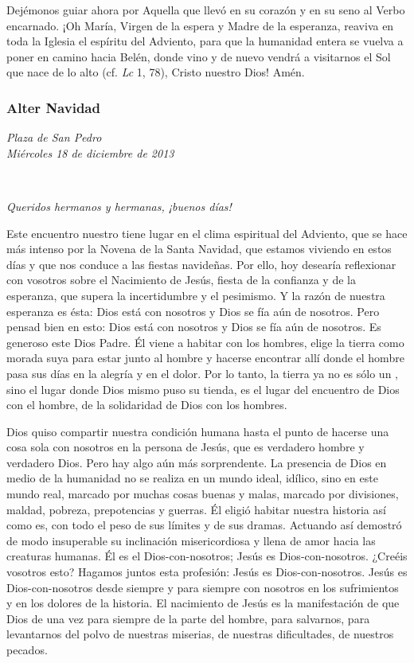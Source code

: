 Dejémonos guiar ahora por Aquella que llevó en su corazón y en su seno al Verbo encarnado. ¡Oh María, Virgen de la espera y Madre de la esperanza, reaviva en toda la Iglesia el espíritu del Adviento, para que la humanidad entera se vuelva a poner en camino hacia Belén, donde vino y de nuevo vendrá a visitarnos el Sol que nace de lo alto (cf. \emph{Lc} 1, 78), Cristo nuestro Dios! Amén.

\subsubsection{Alter Navidad} \emph{Plaza de San Pedro}\\ \emph{Miércoles 18 de diciembre de 2013}


~

\emph{Queridos hermanos y hermanas, ¡buenos días!}

Este encuentro nuestro tiene lugar en el clima espiritual del Adviento, que se hace más intenso por la Novena de la Santa Navidad, que estamos viviendo en estos días y que nos conduce a las fiestas navideñas. Por ello, hoy desearía reflexionar con vosotros sobre el Nacimiento de Jesús, fiesta de la confianza y de la esperanza, que supera la incertidumbre y el pesimismo. Y la razón de nuestra esperanza es ésta: Dios está con nosotros y Dios se fía aún de nosotros. Pero pensad bien en esto: Dios está con nosotros y Dios se fía aún de nosotros. Es generoso este Dios Padre. Él viene a habitar con los hombres, elige la tierra como morada suya para estar junto al hombre y hacerse encontrar allí donde el hombre pasa sus días en la alegría y en el dolor. Por lo tanto, la tierra ya no es sólo un , sino el lugar donde Dios mismo puso su tienda, es el lugar del encuentro de Dios con el hombre, de la solidaridad de Dios con los hombres.

Dios quiso compartir nuestra condición humana hasta el punto de hacerse una cosa sola con nosotros en la persona de Jesús, que es verdadero hombre y verdadero Dios. Pero hay algo aún más sorprendente. La presencia de Dios en medio de la humanidad no se realiza en un mundo ideal, idílico, sino en este mundo real, marcado por muchas cosas buenas y malas, marcado por divisiones, maldad, pobreza, prepotencias y guerras. Él eligió habitar nuestra historia así como es, con todo el peso de sus límites y de sus dramas. Actuando así demostró de modo insuperable su inclinación misericordiosa y llena de amor hacia las creaturas humanas. Él es el Dios-con-nosotros; Jesús es Dios-con-nosotros. ¿Creéis vosotros esto? Hagamos juntos esta profesión: Jesús es Dios-con-nosotros. Jesús es Dios-con-nosotros desde siempre y para siempre con nosotros en los sufrimientos y en los dolores de la historia. El nacimiento de Jesús es la manifestación de que Dios  de una vez para siempre de la parte del hombre, para salvarnos, para levantarnos del polvo de nuestras miserias, de nuestras dificultades, de nuestros pecados.

